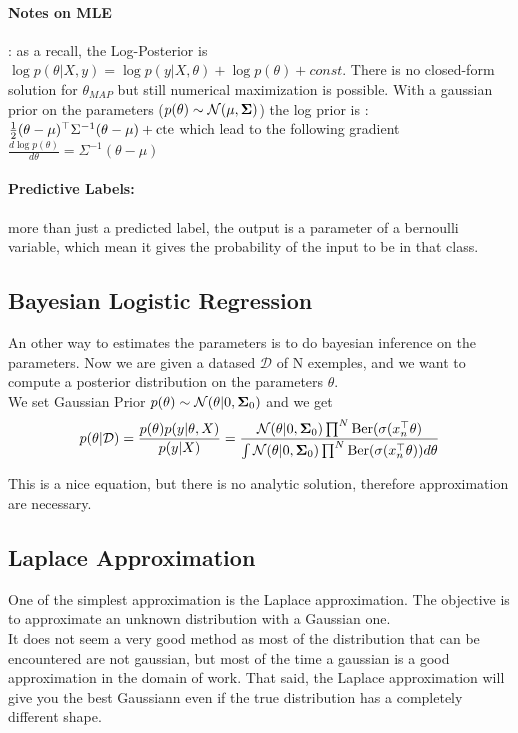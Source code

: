 				\paragraph*{Notes on MLE} : as a recall, the Log-Posterior is $\log p(\theta | X, y) = \log p(y | X, \theta)+\log p(\theta) + const $. There is no closed-form solution for $\theta_{MAP}$ but still numerical maximization is possible. With a gaussian prior on the parameters ($p(\theta) \sim \mathcal{N}(\mu, {\boldsymbol{{\Sigma}}})$) the log prior is : $\frac{1}{2}(\theta - \mu)^\top \Sigma ^{-1} (\theta - \mu) + \text{cte}$ which lead to the following gradient $\frac{d \log p(\theta)}{d\theta} = \Sigma^{-1} (\theta - \mu)$


			\paragraph*{Predictive Labels: } more than just a predicted label, the output is a parameter of a bernoulli variable, which mean it gives the probability of the input to be in that class. 

		\subsection{Bayesian Logistic Regression}
			An other way to estimates the parameters is to do bayesian inference on the parameters.
			Now we are given a datased $\mathcal{D}$ of N exemples, and we want to compute a posterior distribution on the parameters $\theta$. \\
			We set Gaussian Prior $p(\theta) \sim \mathcal{N}(\theta |0, {\boldsymbol{{\Sigma}}}_0)$ and we get 
			\[
				p(\theta | \mathcal{D}) = \frac{p(\theta)p(y|\theta , X)}{p(y|X)} = \frac{\mathcal{N}(\theta |0, {\boldsymbol{{\Sigma}}}_0)\prod^N \text{Ber}(\sigma(x_n ^\top \theta)}{\int \mathcal{N}(\theta |0, {\boldsymbol{{\Sigma}}}_0)\prod^N \text{Ber}(\sigma(x_n ^\top \theta))d\theta}
			\]

			This is a nice equation, but there is no analytic solution, therefore approximation are necessary.

		\subsection{Laplace Approximation}
			One of the simplest approximation is the Laplace approximation. The objective is to approximate an unknown distribution with a Gaussian one.\\
			It does not seem a very good method as most of the distribution that can be encountered are not gaussian, but most of the time a gaussian is a good approximation in the domain of work. That said, the Laplace approximation will give you the best Gaussiann even if the true distribution has a completely different shape.

